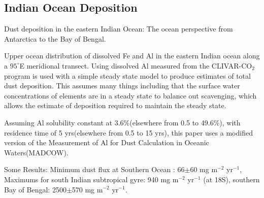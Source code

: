 

\subsection{Indian Ocean Deposition \cite{Grand_2015}}
Dust deposition in the eastern Indian Ocean: The ocean perspective from Antarctica to the Bay of Bengal.

Upper ocean distribution of dissolved Fe and Al in the eastern Indian ocean along a $95^{\circ}$E meridional transect.
Using dissolved Al measured from the CLIVAR-CO$_{2}$ program is used with a simple steady state model to produce estimates of total dust deposition. This assumes many things including that the surface water concentrations of elements are in a steady state to balance out scavenging, which allows the estimate of deposition required to maintain the steady state.

Assuming Al solubility constant at 3.6\%(elsewhere from 0.5 to 49.6\%), with residence time of 5 yrs(elsewhere from 0.5 to 15 yrs), this paper uses a modified version of the Measurement of Al for Dust Calculation in Oceanic Waters(MADCOW).


Some Results:
Minimum dust flux at Southern Ocean : 66$\pm$60 mg m$^{-2}$ yr$^{-1}$, 
Maximums for south Indian subtropical gyre: 940 mg m$^{-2}$ yr$^{-1}$ (at 18S),
southern Bay of Bengal: 2500$\pm$570 mg m$^{-2}$ yr$^{-1}$.
  